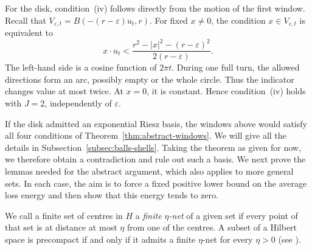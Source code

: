 \documentclass[12pt,reqno,tbtags]{amsart}
\newcommand\1{\mathbbm{1}}
\newcommand{\eps}{\varepsilon}
\begin{document}
For the disk, condition~(iv) follows directly from the motion of the first window.
Recall that $V_{\eps,t}=B(-(r-\eps)u_t,r)$.
For fixed $x\ne0$, the condition $x\in V_{\eps,t}$ is equivalent to
\begin{equation*}
    x\cdot u_t<\frac{r^2-|x|^2-(r-\eps)^2}{2(r-\eps)}.
\end{equation*}
The left-hand side is a cosine function of $2\pi t$.
During one full turn, the allowed directions form an arc, possibly empty or
the whole circle. Thus the indicator changes value at most twice.
At $x=0$, it is constant. Hence condition~(iv) holds with $J=2$,
independently of $\eps$.

If the disk admitted an exponential Riesz basis, the windows above would
satisfy all four conditions of Theorem~\ref{thm:abstract-windows}.
We will give all the details in Subsection~\ref{subsec:balls-shells}.
Taking the theorem as given for now,
we therefore obtain a contradiction and rule out such a basis.
We next prove the lemmas needed for the abstract argument, which also applies
to more general sets. In each case, the aim is to force a fixed positive lower bound
on the average loss energy and then show that this energy tends to zero.

We call a finite set of centres in $H$ a \emph{finite $\eta$-net} of a given set
if every point of that set is at distance at most $\eta$ from one of the centres.
A subset of a Hilbert space is precompact if and only if it admits
a finite $\eta$-net for every $\eta>0$ (see \cite{Lax02}).
\end{document}
